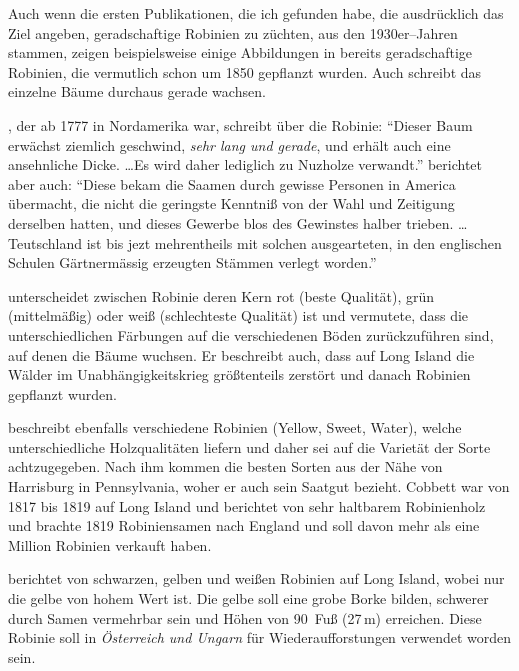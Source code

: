 \documentclass[twocolumn]{scrartcl}
\begin{document}
Auch wenn die ersten Publikationen, die ich gefunden habe, die
ausdrücklich das Ziel angeben, geradschaftige Robinien zu züchten, aus
den 1930er--Jahren stammen, zeigen beispielsweise einige Abbildungen
in \citet{vadas1911robinie} bereits geradschaftige Robinien, die
vermutlich schon um 1850 gepflanzt wurden. Auch
\cite{gaskil1906robinie} schreibt das einzelne Bäume durchaus gerade
wachsen.

\citet[S.~67]{wangenheim1781nordamericanischeHolzarten}, der ab 1777
in Nordamerika war, schreibt über die Robinie: \hypertarget{german:wangenheim1781nordamericanischeHolzartenA}{\enquote{Dieser Baum
  erwächst ziemlich geschwind, \emph{sehr lang und gerade}, und erhält
  auch eine ansehnliche Dicke. \dots Es wird daher lediglich zu Nuzholze
  verwandt.}}
\citet[S.~22--23]{wangenheim1781nordamericanischeHolzarten} berichtet
aber auch: \hypertarget{german:wangenheim1781nordamericanischeHolzartenB}{\enquote{Diese bekam die Saamen durch gewisse Personen in
  America übermacht, die nicht die geringste Kenntniß von der Wahl und
  Zeitigung derselben hatten, und dieses Gewerbe blos des Gewinstes
  halber trieben. \dots Teutschland ist bis jezt mehrentheils mit
  solchen ausgearteten, in den englischen Schulen Gärtnermässig
  erzeugten Stämmen verlegt worden.}}

\citet[S.~249]{Michaux1813arbres} unterscheidet
zwischen Robinie deren Kern rot (beste Qualität), grün (mittelmäßig)
oder weiß (schlechteste Qualität) ist und vermutete, dass die unterschiedlichen
Färbungen auf die verschiedenen Böden zurückzuführen sind, auf denen die Bäume wuchsen.
Er beschreibt auch, dass auf Long
Island die Wälder im Unabhängigkeitskrieg größtenteils zerstört und
danach Robinien gepflanzt wurden.

\citet{cobbett1825woodlands}
beschreibt ebenfalls verschiedene Robinien (Yellow, Sweet, Water),
welche unterschiedliche Holzqualitäten liefern und daher sei auf die
Varietät der Sorte achtzugegeben. Nach ihm kommen die besten
Sorten aus der Nähe von Harrisburg in Pennsylvania, woher er auch
sein Saatgut bezieht. Cobbett war von 1817 bis 1819 auf Long Island
und berichtet von sehr haltbarem Robinienholz und brachte 1819
Robiniensamen nach England und soll davon mehr als eine Million
Robinien verkauft haben.

\citet{hicks1883robinie} berichtet von
schwarzen, gelben und weißen Robinien auf Long Island, wobei nur die
gelbe von hohem Wert ist. Die gelbe soll eine grobe Borke bilden,
schwerer durch Samen vermehrbar sein und Höhen von 90~Fuß (27\,m)
erreichen. Diese Robinie soll in \emph{Österreich und Ungarn} für
Wiederaufforstungen verwendet worden sein.
\end{document}
